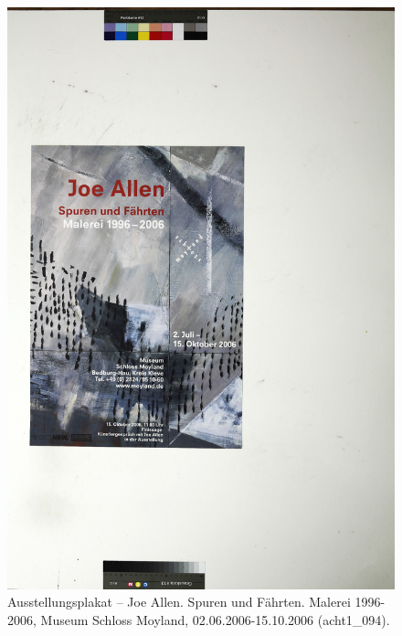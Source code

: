 \documentclass[a4paper,12pt,ngerman]{article}
\begin{document}
\newpage
\begin{figure}[ht]
\includegraphics[width=\linewidth]{Abbildung_45_(acht1_094)}
\centering
\caption{Ausstellungsplakat -- Joe Allen. Spuren und Fährten. Malerei 1996-2006, Museum Schloss Moyland, 02.06.2006-15.10.2006 (acht1\_094).}
\end{figure}
\end{document}
